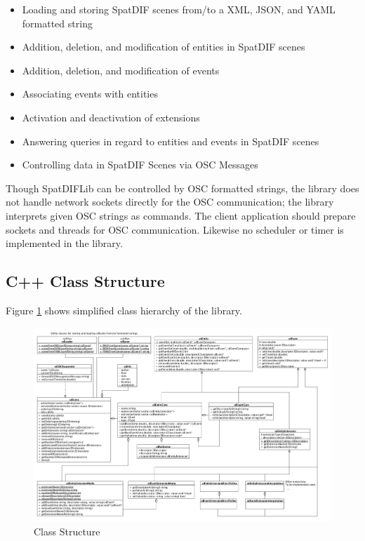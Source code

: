 \documentclass[a4paper]{article}
\begin{document}
\begin{itemize}
\item Loading and storing SpatDIF scenes from/to a XML, JSON, and YAML formatted string
\item Addition, deletion, and modification of entities in SpatDIF scenes
\item Addition, deletion, and modification of events
\item Associating events with entities
\item Activation and deactivation of extensions
\item Answering queries in regard to entities and events in SpatDIF scenes
\item Controlling data in SpatDIF Scenes via OSC Messages
\end{itemize}

Though SpatDIFLib can be controlled by OSC formatted strings, the library does not handle network sockets directly for the OSC communication; the library interprets given OSC strings as commands. The client application should prepare sockets and threads for OSC communication. Likewise no scheduler or timer is implemented in the library. 
  
\subsection{C++ Class Structure}

Figure \ref{fig:class_structure} shows simplified class hierarchy of the library. 


\begin{figure}[t]
\centerline{
	\includegraphics[width= 17.5cm]{classes.pdf}}
\caption{Class Structure }
\label{fig:class_structure}
\end{figure}
\end{document}
